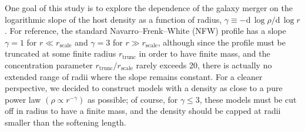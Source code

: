 \documentclass[twocolumn]{aastex63}
\begin{document}
One goal of this study is to explore the dependence of the galaxy merger on the logarithmic slope of the host density as a function of radius, $\gamma\equiv -\mathrm{d}\,\log\rho/\mathrm{d}\,\log r$. For reference, the standard Navarro--Frenk--White (NFW) profile has a slope $\gamma=1$ for $r\ll r_\mathrm{scale}$ and $\gamma=3$ for $r\gg r_\mathrm{scale}$, although since the profile must be truncated at some finite radius $r_\mathrm{trunc}$ in order to have finite mass, and the concentration parameter $r_\mathrm{trunc}/r_\mathrm{scale}$ rarely exceeds 20, there is actually no extended range of radii where the slope remains constant.  For a cleaner perspective, we decided to construct models with a density as close to a pure power law $(\rho\propto r^{-\gamma})$ as possible; of course, for $\gamma\le 3$, these models must be cut off in radius to have a finite mass, and the density should be capped at radii smaller than the softening length. 
\end{document}
